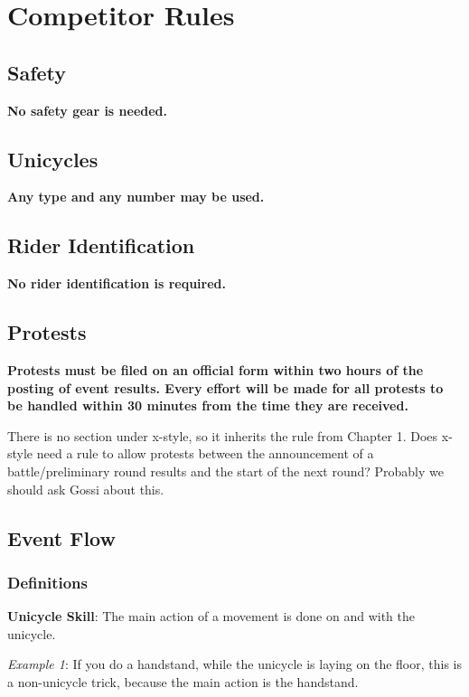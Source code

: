 \chapter{Competitor Rules}

\section{Safety}

\textbf{No safety gear is needed.}

\section{Unicycles}

\textbf{Any type and any number may be used.}

\section{Rider Identification}

\textbf{No rider identification is required.}

\section{Protests}

\textbf{Protests must be filed on an official form within two hours of the posting of event results. Every effort will be made for all protests to be handled within 30 minutes from the time they are received.}

\begin{framed}
There is no section under x-style, so it inherits the rule from Chapter 1.  Does x-style need a rule to allow protests between the announcement of a battle/preliminary round results and the start of the next round? Probably we should ask Gossi about this. 
\end{framed}

\section{Event Flow}

\subsection{Definitions}
\textbf{Unicycle Skill}: The main action of a movement is done on and with the unicycle.

\emph{Example 1}: If you do a handstand, while the unicycle is laying on the floor, this is a non-unicycle trick, because the main action is the handstand.

